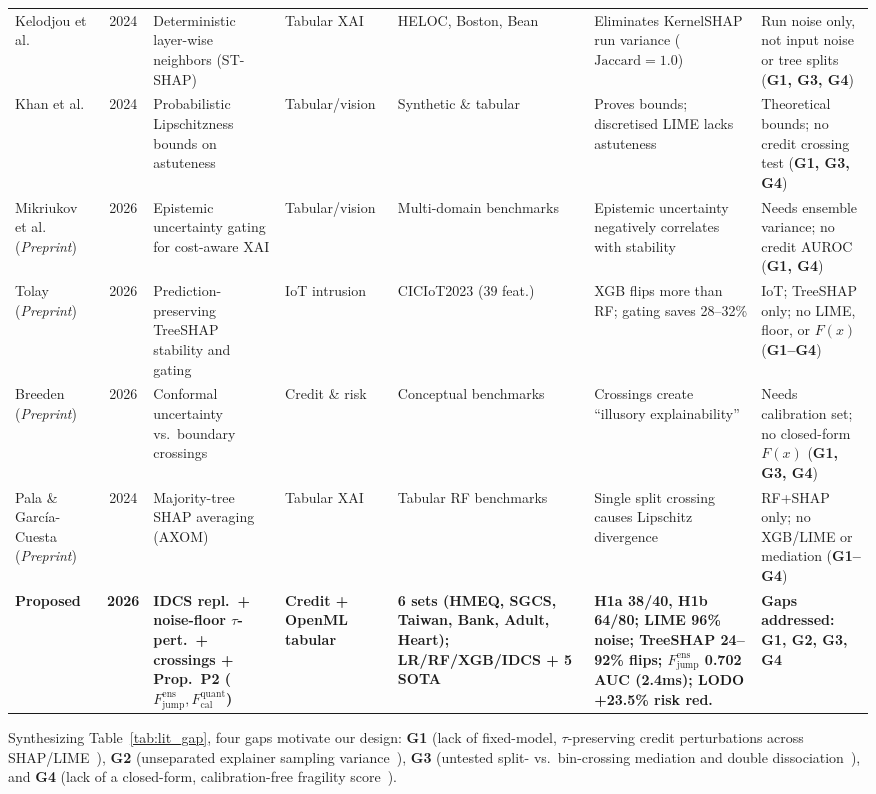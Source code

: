 \documentclass[conference]{IEEEtran}
\begin{document}
\begin{table}[!t]
\begin{tabular}{@{}p{1.9cm}cp{2.8cm}p{1.6cm}p{2.1cm}p{3.6cm}p{3.6cm}@{}}
Kelodjou et al.~\cite{kelodjou2024} & 2024 & Deterministic layer-wise neighbors (ST-SHAP) & Tabular XAI & HELOC, Boston, Bean & Eliminates KernelSHAP run variance ($\text{Jaccard}{=}1.0$) & Run noise only, not input noise or tree splits (\textbf{G1, G3, G4}) \\
Khan et al.~\cite{khan2024} & 2024 & Probabilistic Lipschitzness bounds on astuteness & Tabular/vision & Synthetic \& tabular & Proves bounds; discretised LIME lacks astuteness & Theoretical bounds; no credit crossing test (\textbf{G1, G3, G4}) \\
Mikriukov et al.~\cite{mikriukov2026} (\textit{Preprint}) & 2026 & Epistemic uncertainty gating for cost-aware XAI & Tabular/vision & Multi-domain benchmarks & Epistemic uncertainty negatively correlates with stability & Needs ensemble variance; no credit AUROC (\textbf{G1, G4}) \\
Tolay~\cite{tolay2026} (\textit{Preprint}) & 2026 & Prediction-preserving TreeSHAP stability and gating & IoT intrusion & CICIoT2023 ($39$ feat.) & XGB flips more than RF; gating saves 28--32\% & IoT; TreeSHAP only; no LIME, floor, or $F(x)$ (\textbf{G1--G4}) \\
Breeden~\cite{breeden2026} (\textit{Preprint}) & 2026 & Conformal uncertainty vs.\ boundary crossings & Credit \& risk & Conceptual benchmarks & Crossings create ``illusory explainability'' & Needs calibration set; no closed-form $F(x)$ (\textbf{G1, G3, G4}) \\
Pala \& Garc\'{i}a-Cuesta~\cite{pala2024} (\textit{Preprint}) & 2024 & Majority-tree SHAP averaging (AXOM) & Tabular XAI & Tabular RF benchmarks & Single split crossing causes Lipschitz divergence & RF+SHAP only; no XGB/LIME or mediation (\textbf{G1--G4}) \\
\midrule
\textbf{Proposed} & \textbf{2026} & \textbf{IDCS repl.\ + noise-floor $\tau$-pert.\ + crossings + Prop.~P2 ($F_{\mathrm{jump}}^{\mathrm{ens}}, F_{\mathrm{cal}}^{\mathrm{quant}}$)} & \textbf{Credit + OpenML tabular} & \textbf{6 sets (HMEQ, SGCS, Taiwan, Bank, Adult, Heart); LR/RF/XGB/IDCS + 5 SOTA} & \textbf{H1a 38/40, H1b 64/80; LIME 96\% noise; TreeSHAP 24--92\% flips; $F_{\mathrm{jump}}^{\mathrm{ens}}$ 0.702 AUC (2.4ms); LODO +23.5\% risk red.} & \textbf{Gaps addressed: G1, G2, G3, G4} \\
\bottomrule
\end{tabular}
\end{table}

Synthesizing Table~\ref{tab:lit_gap}, four gaps motivate our design: \textbf{G1} (lack of fixed-model, $\tau$-preserving credit perturbations across SHAP/LIME~\cite{ballegeer2025,lin2025shap}), \textbf{G2} (unseparated explainer sampling variance~\cite{ballegeer2025,nnadi2026}), \textbf{G3} (untested split- vs.\ bin-crossing mediation and double dissociation~\cite{pala2024,khan2024}), and \textbf{G4} (lack of a closed-form, calibration-free fragility score~\cite{mikriukov2026,breeden2026}).
\end{document}
